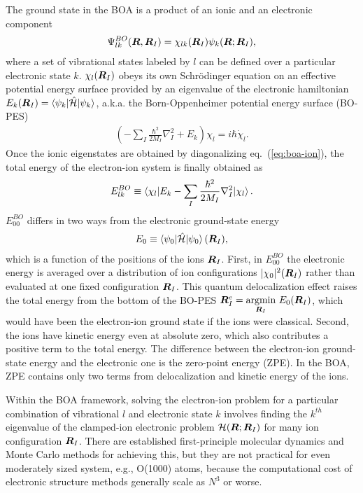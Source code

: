The ground state in the BOA is a product of an ionic and an electronic component
\begin{align} \label{eq:intro-boa-product}
\Psi_{lk}^{BO}(\boldsymbol{R},\boldsymbol{R}_I) = \chi_{lk}(\boldsymbol{R}_I) \psi_k(\boldsymbol{R};\boldsymbol{R}_I),
\end{align}
where a set of vibrational states labeled by $l$ can be defined over a particular electronic state $k$. $\chi_l(\boldsymbol{R}_I)$ obeys its own Schr\"odinger equation on an effective potential energy surface provided by an eigenvalue of the electronic hamiltonian $E_k(\boldsymbol{R}_I) = \braket{\psi_k|\hat{\mathcal{H}}|\psi_k}$, a.k.a. the Born-Oppenheimer potential energy surface (BO-PES)
\begin{align} \label{eq:boa-ion}
\left(-\sum_I\frac{\hbar^2}{2M_I}\nabla^2_I+E_k\right)\chi_l = i\hbar\dot{\chi}_l.
\end{align}
Once the ionic eigenstates are obtained by diagonalizing eq.~(\ref{eq:boa-ion}), the total energy of the electron-ion system is finally obtained as
\begin{align}
E_{lk}^{BO} \equiv \braket{\chi_l| E_k -\sum_I\frac{\hbar^2}{2M_I}\nabla^2_I |\chi_l}.
\end{align}
$E_{00}^{BO}$ differs in two ways from the electronic ground-state energy
\begin{align}
E_0 \equiv \braket{\psi_0|\hat{\mathcal{H}}|\psi_0}(\boldsymbol{R}_I),
\end{align}
which is a function of the positions of the ions $\boldsymbol{R}_I$. First, in $E_{00}^{BO}$ the electronic energy is averaged over a distribution of ion configurations $\vert\chi_0\vert^2(\boldsymbol{R}_I)$ rather than evaluated at one fixed configuration $\boldsymbol{R}_I$. This quantum delocalization effect raises the total energy from the bottom of the BO-PES $\boldsymbol{R}_I^e=\underset{\boldsymbol{R}_I}{\text{argmin}}~E_0(\boldsymbol{R}_I)$, which would have been the electron-ion ground state if the ions were classical. Second, the ions have kinetic energy even at absolute zero, which also contributes a positive term to the total energy.
The difference between the electron-ion ground-state energy and the electronic one is the zero-point energy (ZPE). In the BOA, ZPE contains only two terms from delocalization and kinetic energy of the ions.

Within the BOA framework, solving the electron-ion problem for a particular combination of vibrational $l$ and electronic state $k$ involves finding the $k^{th}$ eigenvalue of the clamped-ion electronic problem $\mathcal{H}(\boldsymbol{R}; \boldsymbol{R}_I)$ for many ion configuration $\boldsymbol{R}_I$. There are established first-principle molecular dynamics and Monte Carlo methods for achieving this, but they are not practical for even moderately sized system, e.g., O(1000) atoms, because the computational cost of electronic structure methods generally scale as $N^3$ or worse.

